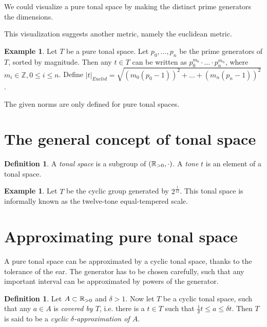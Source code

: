 \documentclass[a4paper]{article}
\theoremstyle{definition}
\newtheorem{definition}[theorem]{Definition}
\newtheorem{example}[theorem]{Example}
\begin{document}
We could visualize a pure tonal space by making the distinct prime generators the dimensions.


This visualization suggests another metric, namely the euclidean metric.

\newcommand{\euclidnorm}[1]{|#1|_{Euclid}}
\newcommand{\euclidmetric}{d_{Euclid}}
\begin{example}
	Let $T$ be a pure tonal space.
	Let $p_0,\dots,p_n$ be the prime generators of $T$, sorted by magnitude.
	Then any $t \in T$ can be written as $p_0^{m_0}\cdot \dots \cdot p_n^{m_n}$, where $m_i \in \mathbb{Z}, 0 \leq i \leq n $.
	Define $\euclidnorm{t} = \sqrt{(m_0(p_0-1))^2 + \dots + (m_n(p_n-1))^2}$.
\end{example}

The given norms are only defined for pure tonal spaces.

\section{The general concept of tonal space}

\begin{definition}
	A \emph{tonal space} is a subgroup of $(\mathbb{R}_{> 0},\cdot)$.
	A \emph{tone} $t$ is an element of a tonal space.
\end{definition}

\begin{example}
	Let $T$ be the cyclic group generated by $2^\frac{1}{12}$.
	This tonal space is informally known as the twelve-tone equal-tempered scale.
\end{example}


\section{Approximating pure tonal space}
A pure tonal space can be approximated by a cyclic tonal space, thanks to the tolerance of the ear.
The generator has to be chosen carefully, such that any important interval can be approximated by powers of the generator.

\begin{definition}
Let $A \subset \mathbb{R}_{> 0}$ and $\delta > 1$.
Now let $T$ be a cyclic tonal space, such that any $a \in A$ is \emph{covered by $T$}, i.e. there is a $t \in T$ such that $\frac{1}{\delta}t \leq a \leq \delta t$.
Then $T$ is said to be a \emph{cyclic $\delta$-approximation of $A$}.
\end{definition}
\end{document}
